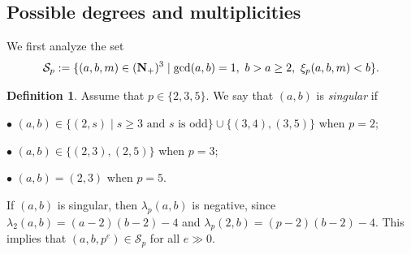 \documentclass{amsart}
\theoremstyle{plain}
\theoremstyle{definition}
\newtheorem{definition}[thm]{Definition}
\newcommand{\N}{{\bf N}}
\begin{document}
\subsection{Possible degrees and multiplicities}


We first analyze the set 
$$
\mathcal{S}_p:=\{ (a,b,m)\in (\N _+)^3\mid 
\gcd (a,b)=1,\ b>a\ge 2,\ 
\xi _p(a,b,m)<b\} . 
$$



\begin{definition}
Assume that $p\in \{ 2,3,5\} $. 
We say that $(a,b)$ is {\it singular} if 

$\bullet $ 
$(a,b)\in \{ (2,s)\mid s\ge 3\text{ and $s$ is odd}\} \cup 
\{ (3,4),(3,5)\} $ 
when $p=2$;  

$\bullet $ 
$(a,b)\in \{ (2,3),(2,5)\} $ 
when $p=3$; 

$\bullet $ 
$(a,b)=(2,3)$ when $p=5$. 
\end{definition}



If $(a,b)$ is singular, 
then $\lambda _p(a,b)$ is negative, 
since $\lambda _2(a,b)=(a-2)(b-2)-4$ and 
$\lambda _p(2,b)=(p-2)(b-2)-4$. 
This implies that 
$(a,b,p^e)\in \mathcal{S}_p$ for all $e\gg 0$. 
\end{document}
